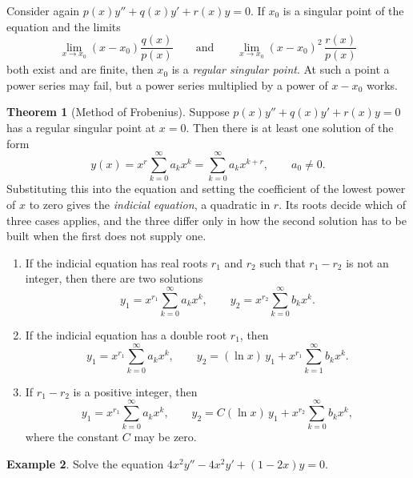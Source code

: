 \documentclass[11pt,a4paper]{article}
\theoremstyle{definition}
\newtheorem{thm}{Theorem}[subsection]
\newtheorem{exa}[thm]{Example}
\begin{document}
Consider again $p(x)y'' + q(x)y' + r(x)y = 0$. If $x_0$ is a singular point of
the equation and the limits
\[\lim_{x \to x_0}(x -x_0) \frac{q(x)}{p(x)}\qquad\text{and}\qquad \lim_{x \to
x_0}(x -x_0)^2\, \frac{r(x)}{p(x)}\]
both exist and are finite, then $x_0$ is a \emph{regular singular point}. At
such a point a power series may fail, but a power series multiplied by a power
of $x - x_0$ works.

\begin{thm}[Method of Frobenius]
\label{thm:frobenius}
Suppose $p(x)y'' + q(x)y' + r(x)y = 0$ has a regular singular point at $x = 0$.
Then there is at least one solution of the form
\[y(x) = x^r \sum^{\infty} _{k = 0} a_k x^k = \sum^{\infty}_{k=0} a_k x^{k+r}
,\qquad a_0\neq 0 .\]
Substituting this into the equation and setting the coefficient of the lowest
power of $x$ to zero gives the \emph{indicial equation}, a quadratic in $r$.
Its roots decide which of three cases applies, and the three differ only in how
the second solution has to be built when the first does not supply one.
\begin{enumerate}
\item If the indicial equation has real roots $r_1$ and $r_2$ such that
$r_1 -r_2$ is not an integer, then there are two solutions
\[y_1 = x^{r_1} \sum^{\infty}_{k = 0} a_k x^k ,\qquad y_2 = x^{r_2}
\sum^{\infty}_{k=0} b_k x^k .\]

\item If the indicial equation has a double root $r_1$, then
\[y_1 = x^{r_1} \sum^{\infty}_{k = 0} a_k x^k ,\qquad y_2 = (\ln x)\, y_1 +
x^{r_1}\sum^{\infty}_{k = 1} b_kx^k .\]

\item If $r_1 - r_2$ is a positive integer, then
\[y_1 = x^{r_1} \sum^{\infty}_{k = 0} a_k x^k ,\qquad y_2 = C(\ln x)\, y_1 +
x^{r_2} \sum^{\infty}_{k=0} b_kx^k ,\]
where the constant $C$ may be zero.
\end{enumerate}
\end{thm}

\begin{exa}
\label{ex:frobenius}
Solve the equation $4x^2 y'' - 4x^2 y' + (1 -2x)y = 0$.
\end{exa}
\end{document}
